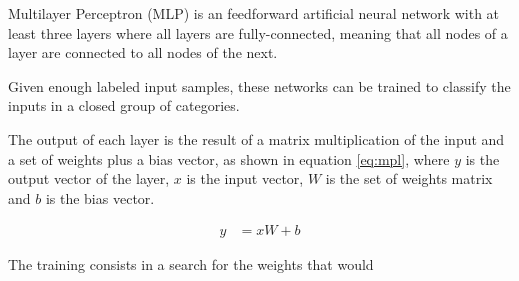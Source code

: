 Multilayer Perceptron (MLP)\cite{rosenblatt_perceptron:_1958} is an feedforward artificial neural network with at least three layers where all layers are fully-connected, meaning that all nodes of a layer are connected to all nodes of the next.

Given enough labeled input samples, these networks can be trained to classify the inputs in a closed group of categories.

The output of each layer is the result of a matrix multiplication of the input and a set of weights plus a bias vector, as shown in equation \ref{eq:mpl}, where $y$ is the output vector of the layer, $x$ is the input vector, $W$ is the set of weights matrix and $b$ is the bias vector.

\begin{align}
\label{eq:mpl}     
y &= x W + b
\end{align}


The training consists in a search for the weights that would \todo{}